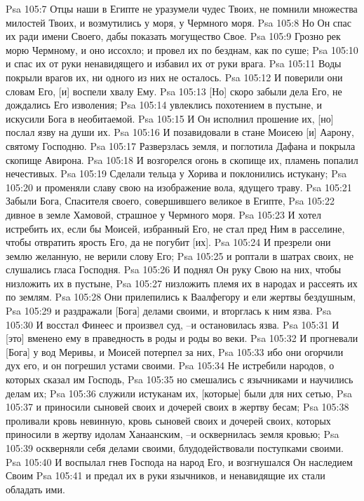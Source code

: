 Psa 105:7  Отцы наши в Египте не уразумели чудес Твоих, не помнили множества милостей Твоих, и возмутились у моря, у Чермного моря.
Psa 105:8  Но Он спас их ради имени Своего, дабы показать могущество Свое.
Psa 105:9  Грозно рек морю Чермному, и оно иссохло; и провел их по безднам, как по суше;
Psa 105:10  и спас их от руки ненавидящего и избавил их от руки врага.
Psa 105:11  Воды покрыли врагов их, ни одного из них не осталось.
Psa 105:12  И поверили они словам Его, [и] воспели хвалу Ему.
Psa 105:13  [Но] скоро забыли дела Его, не дождались Его изволения;
Psa 105:14  увлеклись похотением в пустыне, и искусили Бога в необитаемой.
Psa 105:15  И Он исполнил прошение их, [но] послал язву на души их.
Psa 105:16  И позавидовали в стане Моисею [и] Аарону, святому Господню.
Psa 105:17  Разверзлась земля, и поглотила Дафана и покрыла скопище Авирона.
Psa 105:18  И возгорелся огонь в скопище их, пламень попалил нечестивых.
Psa 105:19  Сделали тельца у Хорива и поклонились истукану;
Psa 105:20  и променяли славу свою на изображение вола, ядущего траву.
Psa 105:21  Забыли Бога, Спасителя своего, совершившего великое в Египте,
Psa 105:22  дивное в земле Хамовой, страшное у Чермного моря.
Psa 105:23  И хотел истребить их, если бы Моисей, избранный Его, не стал пред Ним в расселине, чтобы отвратить ярость Его, да не погубит [их].
Psa 105:24  И презрели они землю желанную, не верили слову Его;
Psa 105:25  и роптали в шатрах своих, не слушались гласа Господня.
Psa 105:26  И поднял Он руку Свою на них, чтобы низложить их в пустыне,
Psa 105:27  низложить племя их в народах и рассеять их по землям.
Psa 105:28  Они прилепились к Ваалфегору и ели жертвы бездушным,
Psa 105:29  и раздражали [Бога] делами своими, и вторглась к ним язва.
Psa 105:30  И восстал Финеес и произвел суд, --и остановилась язва.
Psa 105:31  И [это] вменено ему в праведность в роды и роды во веки.
Psa 105:32  И прогневали [Бога] у вод Меривы, и Моисей потерпел за них,
Psa 105:33  ибо они огорчили дух его, и он погрешил устами своими.
Psa 105:34  Не истребили народов, о которых сказал им Господь,
Psa 105:35  но смешались с язычниками и научились делам их;
Psa 105:36  служили истуканам их, [которые] были для них сетью,
Psa 105:37  и приносили сыновей своих и дочерей своих в жертву бесам;
Psa 105:38  проливали кровь невинную, кровь сыновей своих и дочерей своих, которых приносили в жертву идолам Ханаанским, --и осквернилась земля кровью;
Psa 105:39  оскверняли себя делами своими, блудодействовали поступками своими.
Psa 105:40  И воспылал гнев Господа на народ Его, и возгнушался Он наследием Своим
Psa 105:41  и предал их в руки язычников, и ненавидящие их стали обладать ими.
